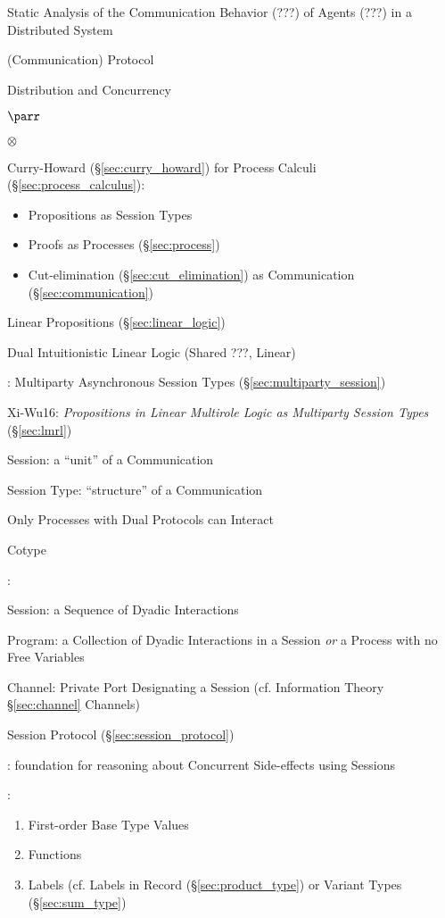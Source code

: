 Static Analysis of the Communication Behavior (???) of Agents (???) in
a Distributed System \cite{gay-vasconcelos10}

(Communication) Protocol

Distribution and Concurrency

$\parr$

$\otimes$

Curry-Howard (\S\ref{sec:curry_howard}) for Process Calculi
(\S\ref{sec:process_calculus}):
\begin{itemize}
  \item Propositions as Session Types
  \item Proofs as Processes (\S\ref{sec:process})
  \item Cut-elimination (\S\ref{sec:cut_elimination}) as Communication
    (\S\ref{sec:communication})
\end{itemize}

Linear Propositions (\S\ref{sec:linear_logic})

Dual Intuitionistic Linear Logic \cite{caires-pfenning10} (Shared ???,
Linear)

\cite{honda-yoshida-carbone08}: Multiparty Asynchronous Session Types
(\S\ref{sec:multiparty_session})

Xi-Wu16: \emph{Propositions in Linear Multirole Logic as
  Multiparty Session Types} (\S\ref{sec:lmrl})

Session: a ``unit'' of a Communication

Session Type: ``structure'' of a Communication

Only Processes with Dual Protocols can Interact

Cotype


\cite{honda-vasconcelos-kubo98}:

Session: a Sequence of Dyadic Interactions

Program: a Collection of Dyadic Interactions in a Session \emph{or} a
Process with no Free Variables %

Channel: Private Port Designating a Session (cf. Information Theory
\S\ref{sec:channel} Channels)

Session Protocol (\S\ref{sec:session_protocol})


\cite{orchard-yoshida15}: foundation for reasoning about Concurrent
Side-effects using Sessions


\cite{neubauer-thiemann04}:
\begin{enumerate}
  \item First-order Base Type Values
  \item Functions
  \item Labels (cf. Labels in Record (\S\ref{sec:product_type}) or
    Variant Types (\S\ref{sec:sum_type})
\end{enumerate}


